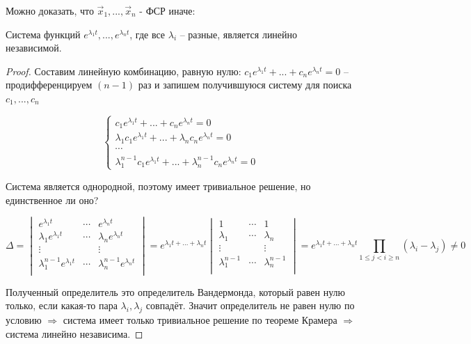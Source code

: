 Можно доказать, что $\vec{x}_1, ..., \vec{x}_n$ - ФСР иначе:
\begin{lemma}
  Система функций $e^{\lambda_1t}, ..., e^{\lambda_n t}$, где все $\lambda_i$ -- разные, является линейно независимой.  
\end{lemma}
\begin{proof}
  Составим линейную комбинацию, равную нулю: $c_1 e^{\lambda_1 t} + ... + c_n e^{\lambda_n t} = 0$ -- продифференцируем $(n-1)$ раз и 
  запишем получившуюся систему для поиска $c_1, ..., c_n$

  \[
  \begin{cases}
    c_1 e^{\lambda_1 t} + ... + c_n e^{\lambda_n t} = 0 \\
    \lambda_1 c_1 e^{\lambda_1 t} + ... + \lambda_n c_n e^{\lambda_n t} = 0 \\
    \cdots \\
    \lambda_1^{n-1} c_1 e^{\lambda_1 t} + ... + \lambda_n^{n-1} c_n e^{\lambda_n t} = 0
  \end{cases} 
  \]

Система является однородной, поэтому имеет тривиальное решение, но единственное ли оно? 

\[ \Delta = \begin{vmatrix*}
  e^{\lambda_1 t} & \cdots & e^{\lambda_n t} \\
  \lambda_1 e^{\lambda_1 t} & \cdots & \lambda_n e^{\lambda_n t} \\
  \vdots &  & \vdots \\ 
  \lambda_1^{n-1} e^{\lambda_1 t} & \cdots & \lambda_n^{n-1} e^{\lambda_n t} \\
\end{vmatrix*} = e^{\lambda_1 t + ... + \lambda_n t} \begin{vmatrix*}
  1 & \cdots & 1 \\
  \lambda_1  & \cdots & \lambda_n  \\
  \vdots &  & \vdots \\ 
  \lambda_1^{n-1}  & \cdots & \lambda_n^{n-1} \\
\end{vmatrix*} = e^{\lambda_1 t + ... + \lambda_n t} \prod \limits_{1 \leq j < i \geq n} (\lambda_i - \lambda_j) \neq 0
\]

Полученный определитель это определитель Вандермонда, который равен нулю только, если какая-то пара $\lambda_i, \lambda_j$ совпадёт. 
Значит определитель не равен нулю по условию $\Rightarrow$ система имеет только тривиальное решение по теореме Крамера $\Rightarrow$ система линейно независима.
\end{proof}

